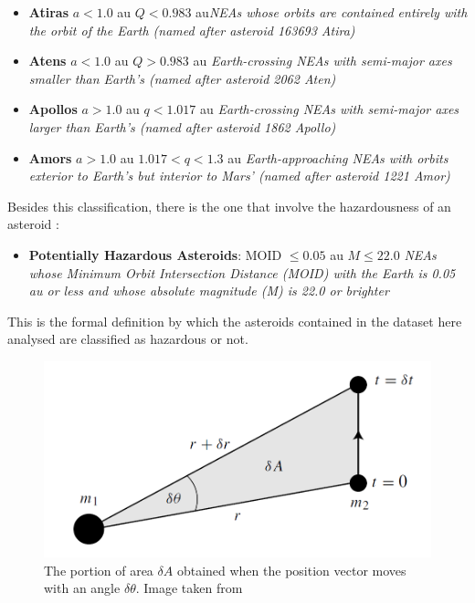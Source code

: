 \documentclass[12pt,%
               a4paper,%
               oneside,openany,%
               titlepage,%
               headinclude,footinclude,%
               BCOR5mm,%
               cleardoublepage=empty,%
               tablecaptionabove,%
               floatperchapter,
               ]{scrreprt}                 %
\begin{document}
\begin{itemize}
\item \textbf{Atiras} $a < 1.0$ au $Q < 0.983$ au\quad \textit{NEAs whose orbits are contained entirely with the orbit of the Earth (named after asteroid 163693 Atira)}
\item \textbf{Atens} $a < 1.0$ au $Q > 0.983$ au \quad \textit{Earth-crossing NEAs with semi-major axes smaller than Earth's (named after asteroid 2062 Aten)}
\item \textbf{Apollos} $a>1.0$ au $q<1.017$ au \quad  \textit{Earth-crossing NEAs with semi-major axes larger than Earth's (named after asteroid 1862 Apollo) }
\item \textbf{Amors} $a>1.0$ au $1.017<q<1.3$ au \textit{Earth-approaching NEAs with orbits exterior to Earth's but interior to Mars' (named after asteroid 1221 Amor)}
\end{itemize}

Besides this classification, there is the one that involve the hazardousness of an asteroid \cite{nasa_classification}:

\begin{itemize}
\item \textbf{Potentially Hazardous Asteroids}: MOID $\leq 0.05$ au $M \leq22.0$ \textit{NEAs whose Minimum Orbit Intersection Distance (MOID) with the Earth is 0.05 au or less and whose absolute magnitude (M) is 22.0 or brighter}
\end{itemize}

This is the formal definition by which the asteroids contained in the dataset here analysed are classified as hazardous or not. 




\begin{figure}[h]
\begin{center}
\includegraphics[width=1\textwidth]{Figures/Area_dynamics.png}
\caption{The portion of area $\delta A$ obtained when the position vector moves with an angle $\delta\theta$. Image taken from \cite{murray1999solar}}
\label{Area_dynamics}
\end{center}
\end{figure}
\end{document}
